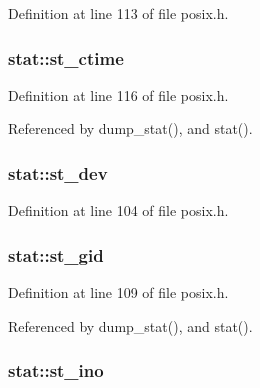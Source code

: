 Definition at line 113 of file posix.\+h.

\subsubsection[{\texorpdfstring{st\+\_\+ctime}{st_ctime}}]{ stat\+::st\+\_\+ctime}\hypertarget{structstat_a1b4b858db1ebe79c3d6e0fc1ef721024}{}\label{structstat_a1b4b858db1ebe79c3d6e0fc1ef721024}


Definition at line 116 of file posix.\+h.



Referenced by dump\+\_\+stat(), and stat().

\subsubsection[{\texorpdfstring{st\+\_\+dev}{st_dev}}]{ stat\+::st\+\_\+dev}\hypertarget{structstat_ac5b90090ae323741ae4c9e4f3683a29f}{}\label{structstat_ac5b90090ae323741ae4c9e4f3683a29f}


Definition at line 104 of file posix.\+h.

\subsubsection[{\texorpdfstring{st\+\_\+gid}{st_gid}}]{ stat\+::st\+\_\+gid}\hypertarget{structstat_ab864f16f436cec370f0ced585d897698}{}\label{structstat_ab864f16f436cec370f0ced585d897698}


Definition at line 109 of file posix.\+h.



Referenced by dump\+\_\+stat(), and stat().

\subsubsection[{\texorpdfstring{st\+\_\+ino}{st_ino}}]{ stat\+::st\+\_\+ino}\hypertarget{structstat_a9769ed8f0d4c5a9f329c32bc92479d56}{}\label{structstat_a9769ed8f0d4c5a9f329c32bc92479d56}



